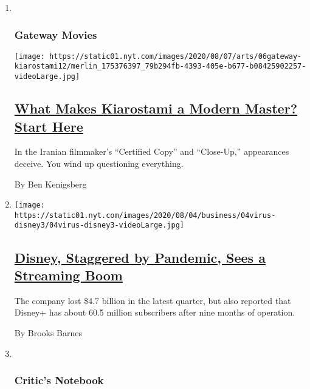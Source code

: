 \begin{enumerate}
\def\labelenumi{\arabic{enumi}.}
\item ~
  \hypertarget{gateway-movies}{%
  \subsubsection{Gateway Movies}\label{gateway-movies}}

  \texttt{[image: https://static01.nyt.com/images/2020/08/07/arts/06gateway-kiarostami12/merlin\_175376397\_79b294fb-4393-405e-b677-b08425902257-videoLarge.jpg]}

  \hypertarget{what-makes-kiarostami-a-modern-master-start-here}{%
  \subsection{\texorpdfstring{\href{/2020/08/06/movies/abbas-kiarostami-iran.html}{What
  Makes Kiarostami a Modern Master? Start
  Here}}{What Makes Kiarostami a Modern Master? Start Here}}\label{what-makes-kiarostami-a-modern-master-start-here}}

  In the Iranian filmmaker's ``Certified Copy'' and ``Close-Up,''
  appearances deceive. You wind up questioning everything.

  By Ben Kenigsberg
\item
  \texttt{[image: https://static01.nyt.com/images/2020/08/04/business/04virus-disney3/04virus-disney3-videoLarge.jpg]}

  \hypertarget{disney-staggered-by-pandemic-sees-a-streaming-boom}{%
  \subsection{\texorpdfstring{\href{/2020/08/04/business/media/disney-earnings-coronavirus.html}{Disney,
  Staggered by Pandemic, Sees a Streaming
  Boom}}{Disney, Staggered by Pandemic, Sees a Streaming Boom}}\label{disney-staggered-by-pandemic-sees-a-streaming-boom}}

  The company lost \$4.7 billion in the latest quarter, but also
  reported that Disney+ has about 60.5 million subscribers after nine
  months of operation.

  By Brooks Barnes
\item ~
  \hypertarget{critics-notebook}{%
  \subsubsection{Critic's Notebook}\label{critics-notebook}}


\end{enumerate}
